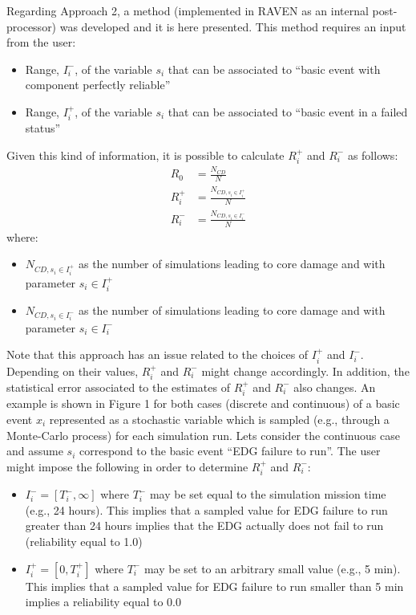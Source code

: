 Regarding Approach 2, a method (implemented in RAVEN as an internal post-processor) was developed and it is 
here presented. This method requires an input from the user:
\begin{itemize}
  \item Range, $I_i^-$, of the variable $s_i$ that can be associated to ``basic event with component perfectly reliable''
  \item Range, $I_i^+$, of the variable $s_i$ that can be associated to ``basic event in a failed status''
\end{itemize}
Given this kind of information, it is possible to calculate $R_i^+$ and $R_i^-$ as follows:
\begin{align} 
  R_0   &= \frac{N_{CD}}{N}  \\
  R_i^+ &= \frac{N_{CD, s_i \in I_i^+}}{N}   \\
  R_i^- &= \frac{N_{CD, s_i \in I_i^-}}{N} 
\end{align}
where:
\begin{itemize}
  \item $N_{CD, s_i \in I_i^+}$ as the number of simulations leading to core damage and with parameter $s_i \in I_i^+$
  \item $N_{CD, s_i \in I_i^-}$ as the number of simulations leading to core damage and with parameter $s_i \in I_i^-$
\end{itemize}

Note that this approach has an issue related to the choices of $I_i^+$ and $I_i^-$. 
Depending on their values, $R_i^+$ and $R_i^-$ might change accordingly. In addition, the statistical error 
associated to the estimates of $R_i^+$ and $R_i^-$ also changes. 
An example is shown in Figure 1 for both cases (discrete and continuous) of a basic event $x_i$ represented 
as a stochastic variable which is sampled (e.g., through a Monte-Carlo process) for each simulation run.
Lets consider the continuous case and assume $s_i$ correspond to the basic event ``EDG failure to run''. 
The user might impose the following in order to determine $R_i^+$ and $R_i^-$:
\begin{itemize}
  \item $I_i^-=[T_i^-,\infty]$ where $T_i^-$ may be set equal to the simulation mission time (e.g., 24 hours). 
        This implies that a sampled value for EDG failure to run greater than 24 hours implies that the 
        EDG actually does not fail to run (reliability equal to 1.0)
  \item $I_i^+=[0,T_i^+ ]$ where $T_i^-$ may be set to an arbitrary small value (e.g., 5 min). This implies that 
        a sampled value for EDG failure to run smaller than 5 min implies a reliability equal to 0.0
\end{itemize}

